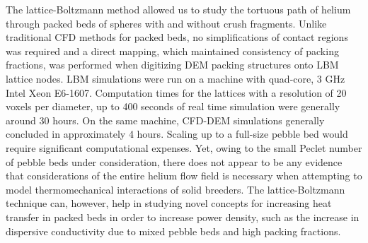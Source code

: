 The lattice-Boltzmann method allowed us to study the tortuous path of helium through packed beds of spheres with and without crush fragments. Unlike traditional CFD methods for packed beds, no simplifications of contact regions was required and a direct mapping, which maintained consistency of packing fractions, was performed when digitizing DEM packing structures onto LBM lattice nodes. LBM simulations were run on a machine with quad-core, 3 GHz Intel Xeon E6-1607. Computation times for the lattices with a resolution of 20 voxels per diameter, up to 400 seconds of real time simulation were generally around 30 hours. On the same machine, CFD-DEM simulations generally concluded in approximately 4 hours. Scaling up to a full-size pebble bed would require significant computational expenses. Yet, owing to the small Peclet number of pebble beds under consideration, there does not appear to be any evidence that considerations of the entire helium flow field is necessary when attempting to model thermomechanical interactions of solid breeders. The lattice-Boltzmann technique can, however, help in studying novel concepts for increasing heat transfer in packed beds in order to increase power density, such as the increase in dispersive conductivity due to mixed pebble beds and high packing fractions.